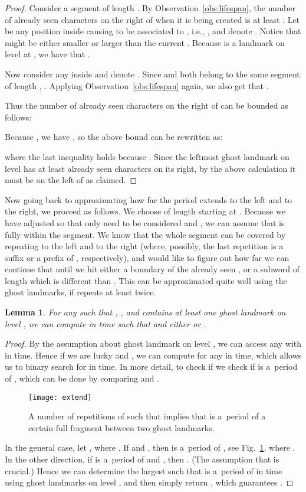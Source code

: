 \documentclass{article}[11pt,letter]
\newtheorem{lemma}[definition]{Lemma}
\newcommand{\ie}{i.e.\xspace}
\begin{document}
\begin{proof}
Consider a segment  of length . By Observation~\ref{obs:lifespan}, the number of already seen characters on the right
of  when it is being created is at least . Let  be any position inside 
causing  to be associated to , \ie, , and denote
. Notice that  might be either smaller or larger than the current . Because  is a landmark
on level  at , we have that .

Now consider any  inside  and denote . Since  and  both belong to the same segment of length ,
. Applying Observation~\ref{obs:lifespan} again, we also get that
.

Thus the number of already seen characters on the right of  can be bounded as follows:

Because , we have , so
the above bound can be rewritten as:

where the last inequality holds because .
Since the leftmost ghost landmark on level  has at least  already seen characters on its right,
by the above calculation it must be on the left of  as claimed.
\end{proof}

Now going back to approximating how far the period extends to the left and to the right, we proceed as follows.
We choose  of length  starting at . Because we have adjusted  so that only  need to
be considered and , we can assume that  is fully within the segment.
We know that the whole segment can be covered by repeating  to the left and to the right (where, possibly, the last repetition is
a suffix or a prefix of , respectively), and would like to figure out how far we can continue that until we hit either a boundary of the already seen
, or a subword of length  which is different than . This can be approximated quite well using the ghost landmarks,
if  repeats at least twice.

\begin{lemma}
For any  such that , , and  contains at least one ghost landmark on level
, we can compute in  time 
such that  and either  or .
\label{lemma:extend}
\end{lemma}

\begin{proof}
By the assumption about ghost landmark on level , we can access any  with
 in  time.
Hence if we are lucky and , we can compute  for any 
in  time, which allows us to binary search for  in  time. In more
detail, to check if  we check if  is a~period of ,
which can be done by comparing  and
.

\begin{figure}[t]
\texttt{[image: extend]}
\caption{A number of repetitions of  such that  implies that  is a~period of a
certain full fragment between two ghost landmarks.} 
\label{fig:extend}
\end{figure}

In the general case, let , where .
If  and , then  is a~period of ,
see Fig.~\ref{fig:extend}, where . In the other direction, if  is a~period of
 and , then . (The assumption that
 is crucial.) Hence we can determine the largest  such that
 is a~period of  in  time using ghost landmarks
on level , and then simply return , which guarantees .
\end{proof}
\end{document}
